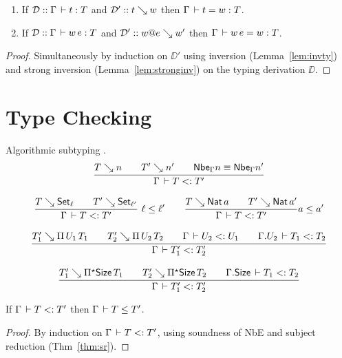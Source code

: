 \documentclass[acmlarge,review,anonymous]{acmart}\settopmatter{printfolios=true}
\begin{document}
\begin{theorem}
  \label{thm:sr}
  \bla
  \begin{enumerate}
  \item
  If $\mathcal{D} :: \Gamma \,\vdash t : T$ and $\mathcal{D}' :: t \searrow w$ then $\Gamma \,\vdash t = w : T$.
  \item
  If $\mathcal{D} :: \Gamma \,\vdash w\, e : T$ and $\mathcal{D}' :: w @ e \searrow w'$ then $\Gamma \,\vdash w\,e = w : T$.
  \end{enumerate}
\end{theorem}
\begin{proof}
  Simultaneously by induction on $\DD'$
  using inversion (Lemma~\ref{lem:invty}) and strong inversion (Lemma~\ref{lem:stronginv})
  on the typing derivation $\DD$. %
\end{proof}

\section{Type Checking}
\label{sec:tycheck}

Algorithmic subtyping .
\begin{gather*}
  \ru{T \evalsto n \qquad
      T' \evalsto n' \qquad
      \Nbe \Gamma n \equiv \Nbe \Gamma n'
    }{\Gamma \der T \asub T'}
\\[2ex]
  \rux{T \evalsto \Set[\ell] \qquad
      T' \evalsto \Set[\ell']
    }{\Gamma \der T \asub T'
    }{\ell \leq \ell'}
\qquad
  \ru{T \evalsto \Nat a \qquad
      T' \evalsto \Nat a'
    }{\Gamma \der T \asub T'
    }{a \leq a'}
\\[2ex]
  \ru{T_1' \evalsto \piT{U_1}{T_1} \qquad
      T_2' \evalsto \piT{U_2}{T_2} \qquad
      \Gamma \der U_2 \asub U_1 \qquad
      \cext \Gamma {U_2} \der T_1 \asub T_2
    }{\Gamma \der T_1' \asub T_2'}
\\[2ex]
  \ru{T_1' \evalsto \epiT\Size{T_1} \qquad
      T_2' \evalsto \epiT\Size{T_2} \qquad
      \cext \Gamma {\Size} \der T_1 \asub T_2
    }{\Gamma \der T_1' \asub T_2'}
\end{gather*}

\begin{lemma}
  \label{lem:asubsound}
  If $\Gamma \,\vdash T \mathrel{{<}{:}} T'$ then $\Gamma \,\vdash T \leq T'$.
\end{lemma}
\begin{proof}
  By induction on $\Gamma \,\vdash T \mathrel{{<}{:}} T'$, using soundness of NbE and subject reduction (Thm~\ref{thm:sr}).
\end{proof}
\end{document}

